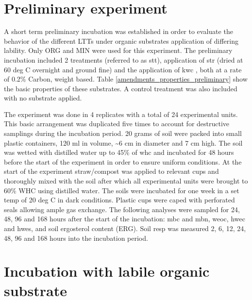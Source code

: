 \section{Preliminary experiment}

	A short term preliminary incubation was established in order to evaluate the behavior of the different LTTs under organic substrates application of differing lability.  Only ORG and MIN were used for this experiment.  The preliminary incubation included 2 treatments (referred to as \gls{stt}), application of \gls{str} (dried at 60 deg C overnight and ground fine) and the application of \gls{kwc} , both at a rate of 0.2\% Carbon, weight based. Table \ref{amendments_properties_preliminary} show the basic properties of these substrates. A control treatment was also included with no substrate applied.

		

	\noindent The experiment was done in 4 replicates with a total of 24 experimental units. This basic arrangement was duplicated five times to account for destructive samplings during the incubation period. 20 grams of soil were packed into small plastic containers, 120 ml in volume, \~{}6 cm in diameter and 7 cm high. The soil was wetted with distilled water up to 45\% of \gls{whc} and incubated for 48 hours before the start of the experiment in order to ensure uniform conditions. At the start of the experiment straw/compost was applied to relevant cups and thoroughly mixed with the soil after which all experimental units were brought to 60\% WHC using distilled water. The soils were incubated for one week in a set temp of 20 deg C in dark conditions. Plastic cups were caped with perforated seals allowing ample gas exchange. The following analyses were sampled for 24, 48, 96 and 168 hours after the start of the incubation: \gls{mbc} and \gls{mbn}, \gls{weoc}, \gls{hwec} and \gls{hwes},  and soil ergosterol content (ERG). Soil \gls{resp} was measured 2, 6, 12, 24, 48, 96 and 168 hours into the incubation period.


\section{Incubation with labile organic substrate}

